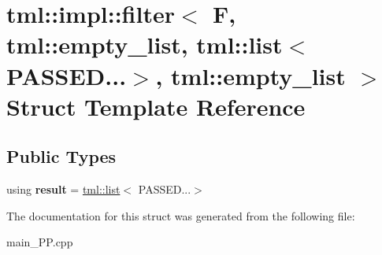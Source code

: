 \hypertarget{structtml_1_1impl_1_1filter_3_01F_00_01tml_1_1empty__list_00_01tml_1_1list_3_01PASSED_8_8_8_4_00_01tml_1_1empty__list_01_4}{\section{tml\+:\+:impl\+:\+:filter$<$ F, tml\+:\+:empty\+\_\+list, tml\+:\+:list$<$ P\+A\+S\+S\+E\+D...$>$, tml\+:\+:empty\+\_\+list $>$ Struct Template Reference}
\label{structtml_1_1impl_1_1filter_3_01F_00_01tml_1_1empty__list_00_01tml_1_1list_3_01PASSED_8_8_8_4_00_01tml_1_1empty__list_01_4}
}
\subsection*{Public Types}
\begin{DoxyCompactItemize}
\item 
\hypertarget{structtml_1_1impl_1_1filter_3_01F_00_01tml_1_1empty__list_00_01tml_1_1list_3_01PASSED_8_8_8_4_00_01tml_1_1empty__list_01_4_af54f821377ff269bfdeebde54d733458}{using {\bfseries result} = \hyperlink{structtml_1_1list}{tml\+::list}$<$ P\+A\+S\+S\+E\+D...$>$}\label{structtml_1_1impl_1_1filter_3_01F_00_01tml_1_1empty__list_00_01tml_1_1list_3_01PASSED_8_8_8_4_00_01tml_1_1empty__list_01_4_af54f821377ff269bfdeebde54d733458}

\end{DoxyCompactItemize}


The documentation for this struct was generated from the following file\+:\begin{DoxyCompactItemize}
\item 
main\+\_\+\+P\+P.\+cpp\end{DoxyCompactItemize}

